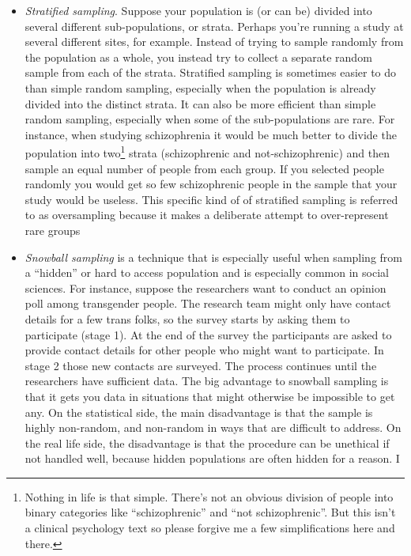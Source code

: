 \documentclass[
  a4paper,
]{book}
\providecommand{\tightlist}{%
  \setlength{\itemsep}{0pt}\setlength{\parskip}{0pt}}\usepackage{longtable,booktabs,array}
\begin{document}
\begin{itemize}
\tightlist
\item
  \emph{Stratified sampling}. Suppose your population is (or can be)
  divided into several different sub-populations, or strata. Perhaps
  you're running a study at several different sites, for example.
  Instead of trying to sample randomly from the population as a whole,
  you instead try to collect a separate random sample from each of the
  strata. Stratified sampling is sometimes easier to do than simple
  random sampling, especially when the population is already divided
  into the distinct strata. It can also be more efficient than simple
  random sampling, especially when some of the sub-populations are rare.
  For instance, when studying schizophrenia it would be much better to
  divide the population into two\footnote{Nothing in life is that
    simple. There's not an obvious division of people into binary
    categories like ``schizophrenic'' and ``not schizophrenic''. But
    this isn't a clinical psychology text so please forgive me a few
    simplifications here and there.} strata (schizophrenic and
  not-schizophrenic) and then sample an equal number of people from each
  group. If you selected people randomly you would get so few
  schizophrenic people in the sample that your study would be useless.
  This specific kind of of stratified sampling is referred to as
  oversampling because it makes a deliberate attempt to over-represent
  rare groups
\item
  \emph{Snowball sampling} is a technique that is especially useful when
  sampling from a ``hidden'' or hard to access population and is
  especially common in social sciences. For instance, suppose the
  researchers want to conduct an opinion poll among transgender people.
  The research team might only have contact details for a few trans
  folks, so the survey starts by asking them to participate (stage 1).
  At the end of the survey the participants are asked to provide contact
  details for other people who might want to participate. In stage 2
  those new contacts are surveyed. The process continues until the
  researchers have sufficient data. The big advantage to snowball
  sampling is that it gets you data in situations that might otherwise
  be impossible to get any. On the statistical side, the main
  disadvantage is that the sample is highly non-random, and non-random
  in ways that are difficult to address. On the real life side, the
  disadvantage is that the procedure can be unethical if not handled
  well, because hidden populations are often hidden for a reason. I

\end{itemize}
\end{document}
